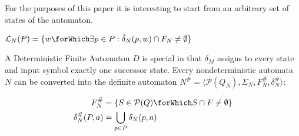 For the purposes of this paper it is interesting to start from an arbitrary set of states of the automaton.

\begin{definition}
  $\mathcal{L}_N(P) = \{ w \forWhich \exists p \in P: \hat{\delta}_N(p, w) \cap F_N \neq \emptyset\}$
\end{definition}

A Deterministic Finite Automaton $D$ is special in that $\delta_M$ assigns to
every state and input symbol exactly one successor state. Every
nondeterministic automata $N$ can be converted into the definite automaton
$N^\# = \langle \mathcal{P}(Q_N), \Sigma_N, F_N^\#, \delta_N^\# \rangle$:

\begin{definition}
  \begin{align*}
    F_N^\# &= \{ S \in \mathcal{P}(Q) \forWhich S \cap F \neq \emptyset \}\\
    \delta_N^\#(P, a) &= \bigcup_{p \in P} \delta_N(p, a)
  \end{align*}
\end{definition}
